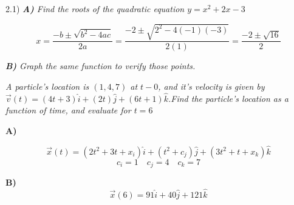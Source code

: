 \documentclass[12.0pt, letterpaper]{article}
\begin{document}
    \begin{paragraph}{2.1)}
        \textit{
            \textbf{A)} Find the roots of the quadratic equation
            $y = x^2+2x-3$
        }

        \begin{equation*}
            x = \frac{-b\pm\sqrt{b^2-4ac}}{2a}
            = \frac{-2\pm\sqrt{2^2-4(-1)(-3)}}{2(1)}
            = \frac{-2\pm\sqrt{16}}{2}
        \end{equation*} 
        \begin{center}
        \end{center}

        \textit{
            \textbf{B)} Graph the same function to verify those points.
        }

        \begin{center}
        \end{center}

    \end{paragraph}
    \pagebreak
    \begin{paragraph}{2.2}
        \textit{A particle's location is $(1, 4, 7)$ at $t-0$,
        and it's velocity is given by $\vec{v}(t) = (4t+3)\hat{i} +
        (2t)\hat{j} + (6t+1)\hat{k}$.Find the particle's location
        as a function of time, and evaluate for $t=6$ }

        \textbf{A)} 

        \begin{equation*}
            \vec{x}(t) = (2t^2+3t+x_i)\hat{i} + (t^2+c_j)\hat{j} + 
            (3t^2 + t + x_k)\hat{k}
        \end{equation*}
        \begin{equation*}
            c_i = 1 \quad
            c_j = 4 \quad
            c_k = 7 
        \end{equation*}
        \begin{center}
        \end{center}

        \textbf{B)}
        \begin{equation*}
            \vec{x}(6) = 91\hat{i} + 40\hat{j} + 121\hat{k}
        \end{equation*}
    \end{paragraph}
\end{document}
